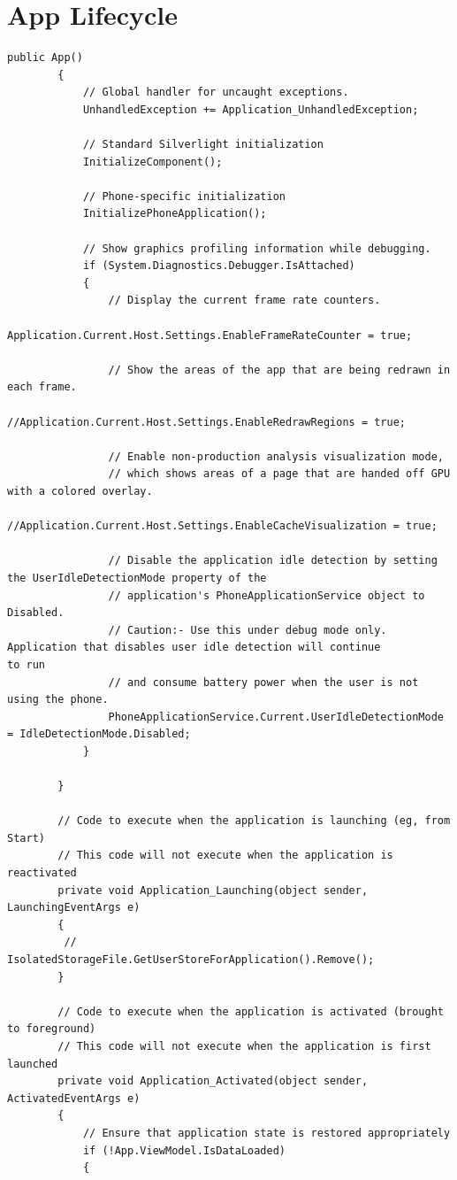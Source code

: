\documentclass[a4paper,10pt]{scrreprt}
\begin{document}
\chapter{App Lifecycle}
\begin{lstlisting}
public App()
        {
            // Global handler for uncaught exceptions. 
            UnhandledException += Application_UnhandledException;

            // Standard Silverlight initialization
            InitializeComponent();

            // Phone-specific initialization
            InitializePhoneApplication();

            // Show graphics profiling information while debugging.
            if (System.Diagnostics.Debugger.IsAttached)
            {
                // Display the current frame rate counters.
                Application.Current.Host.Settings.EnableFrameRateCounter = true;

                // Show the areas of the app that are being redrawn in each frame.
                //Application.Current.Host.Settings.EnableRedrawRegions = true;

                // Enable non-production analysis visualization mode, 
                // which shows areas of a page that are handed off GPU with a colored overlay.
                //Application.Current.Host.Settings.EnableCacheVisualization = true;

                // Disable the application idle detection by setting the UserIdleDetectionMode property of the
                // application's PhoneApplicationService object to Disabled.
                // Caution:- Use this under debug mode only. Application that disables user idle detection will continue 
to run
                // and consume battery power when the user is not using the phone.
                PhoneApplicationService.Current.UserIdleDetectionMode = IdleDetectionMode.Disabled;
            }

        }

        // Code to execute when the application is launching (eg, from Start)
        // This code will not execute when the application is reactivated
        private void Application_Launching(object sender, LaunchingEventArgs e)
        {
         //   IsolatedStorageFile.GetUserStoreForApplication().Remove();
        }

        // Code to execute when the application is activated (brought to foreground)
        // This code will not execute when the application is first launched
        private void Application_Activated(object sender, ActivatedEventArgs e)
        {
            // Ensure that application state is restored appropriately
            if (!App.ViewModel.IsDataLoaded)
            {
                

\end{lstlisting}
\end{document}
